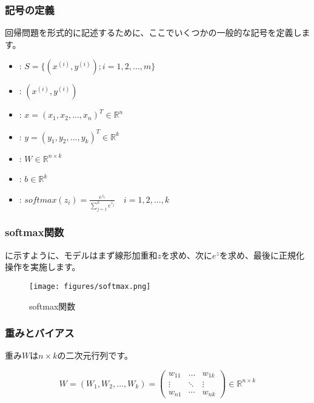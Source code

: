\begin{content}
\begin{content}
\subsubsection{記号の定義}

回帰問題を形式的に記述するために、ここでいくつかの一般的な記号を定義します。

 \begin{itemize}
   \item {}: $ S = \{ ({x^{(i)}},{y^{(i)}});i = 1,2,...,m\} $
   \item {}: $ ({x^{(i)}},{y^{(i)}}) $
   \item {}: $ x = ({x_1},{x_2},...,{x_n})^{T}  \in {\mathbb{R}^n} $
   \item {}: $ y = ({y_1},{y_2},...,{y_k})^{T} \in {\mathbb{R}^k} $
   \item {}: $ W \in {\mathbb{R}^{n \times k}} $   
   \item {}: $ b \in {\mathbb{R}^k} $   
   \item {}: $ 
softmax {(z_i)} = \tfrac{{{e^{{z_i}}}}}{{\sum\limits_{j = 1}^k {{e^{{z_j}}}} }}  \quad i = 1,2,...,k
$
 \end{itemize}

\subsubsection{softmax関数}

に示すように、モデルはまず線形加重和$z$を求め、次に$e^z$を求め、最後に正規化操作を実施します。

\begin{figure}[H]
\centering
\texttt{[image: figures/softmax.png]}
\caption{softmax関数}
 \label{fig:softmax}
\end{figure}

\subsubsection{重みとバイアス}

重み$W$は$n \times k$の二次元行列です。

\[
W = \left( {{W_1},{W_2},...,{W_k}} \right) = \left( {\begin{array}{*{20}{c}}
  {{w_{11}}}& \ldots &{{w_{1k}}} \\ 
   \vdots & \ddots & \vdots  \\ 
  {{w_{n1}}}& \cdots &{{w_{nk}}} 
\end{array}} \right) \in {\mathbb{R}^{n \times k}}
\]


\end{content}
\end{content}
